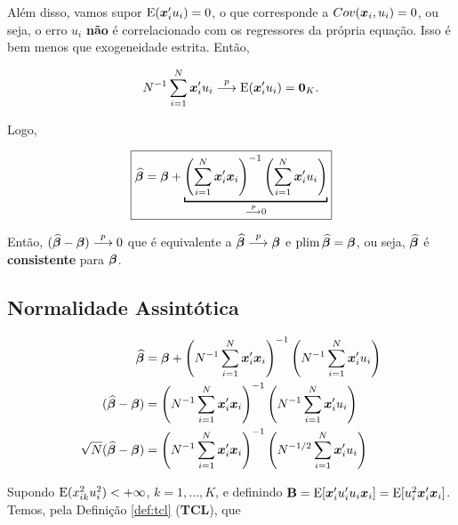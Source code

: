 \documentclass[11pt, oneside, a4paper, article]{article}
\numberwithin{equation}{section}
\begin{document}
Além disso, vamos supor $\text{E}(\boldsymbol{x}_{i}' u_{i}) = 0$, o que corresponde a $Cov(\boldsymbol{x}_{i}, u_{i}) = 0$, ou seja, o erro $u_{i}$ \textbf{não} é correlacionado com os regressores da própria equação.
Isso é bem menos que exogeneidade estrita.
Então, 

\vspace{-1 em}
\begin{align*}
	N^{-1} \sum_{i=1}^{N} \boldsymbol{x}_{i}' u_{i}  \overset{p}{\longrightarrow}  \text{E}(\boldsymbol{x}_{i}' u_{i}) = \boldsymbol{0}_{K}.
\end{align*}

Logo,

\vspace{-1 em}
\begin{align*}
	\boxed{
\betahatbold = 
\betavec +
\underbracket[1pt]{
\left( \sum_{i=1}^{N} \mbs{x}_{i}' \mbs{x}_{i} \right)^{-1}
\left( \sum_{i=1}^{N} \mbs{x}_{i}' u_{i} \right)}_{\arrowp 0}
}
\end{align*}

Então, 
$(\widehat{\boldsymbol{\beta}} - \boldsymbol{\beta})  \overset{p}{\longrightarrow}  0$ 
que é equivalente a 
$\widehat{\boldsymbol{\beta}}  \overset{p}{\longrightarrow}  \boldsymbol{\beta}$ e 
$\text{plim} \,\widehat{\boldsymbol{\beta}} = \boldsymbol{\beta}$,
ou seja, $\widehat{\boldsymbol{\beta}}$ é \textbf{consistente} para $\boldsymbol{\beta}$.

\subsection{Normalidade Assintótica} %

\vspace{-2 em}
\begin{align*}
\widehat{\boldsymbol{\beta}} 
&= 
\boldsymbol{\beta} +
\left( N^{-1} \sum_{i=1}^{N} \boldsymbol{x}_{i}' \boldsymbol{x}_{i} \right)^{-1}
\left( N^{-1} \sum_{i=1}^{N} \boldsymbol{x}_{i}' u_{i} \right)
\\
(\widehat{\boldsymbol{\beta}} - \boldsymbol{\beta})
&=
\left( N^{-1} \sum_{i=1}^{N} \boldsymbol{x}_{i}' \boldsymbol{x}_{i} \right)^{-1}
\left( N^{-1} \sum_{i=1}^{N} \boldsymbol{x}_{i}' u_{i} \right)
\\
\sqrt{N} (\widehat{\boldsymbol{\beta}} - \boldsymbol{\beta}) &=
\left( N^{-1} \sum_{i=1}^{N} \boldsymbol{x}_{i}' \boldsymbol{x}_{i} \right)^{-1}
\left( N^{-1/2} \sum_{i=1}^{N} \boldsymbol{x}_{i}' u_{i} \right)
\end{align*}

\noindent
Supondo
$\text{E}( x_{ik}^{2} u_{i}^{2} ) < + \infty$,
$k=1, \dots, K$, e definindo
$\mathbf{B} = \text{E}[\boldsymbol{x}_{i}' u_{i}' u_{i} \boldsymbol{x}_{i}] = \text{E}[ u_{i}^2 \boldsymbol{x}_{i}' \boldsymbol{x}_{i} ]$.
Temos, pela Definição \ref{def:tcl} (\textbf{TCL}), que
\end{document}
